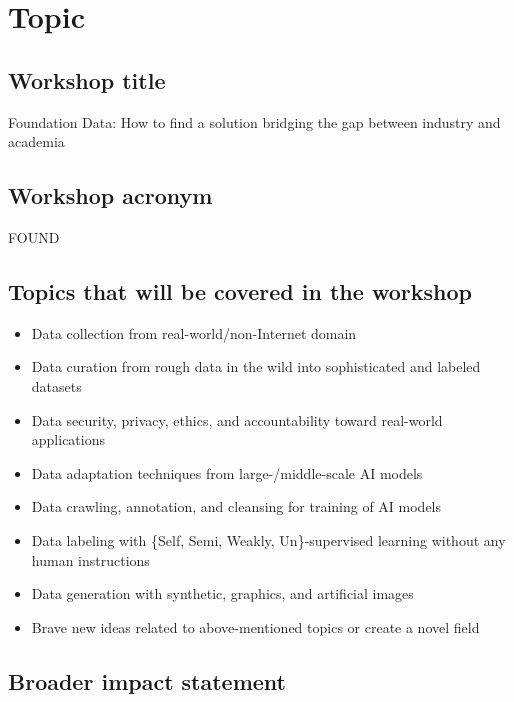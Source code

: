 \documentclass{article}
\begin{document}
\section{Topic}

\subsection{Workshop title}
Foundation Data: How to find a solution bridging the gap between industry and academia

\subsection{Workshop acronym}
FOUND

\subsection{Topics that will be covered in the workshop}
\begin{itemize}
    \item Data collection from real-world/non-Internet domain
    \item Data curation from rough data in the wild into sophisticated and labeled datasets
    \item Data security, privacy, ethics, and accountability toward real-world applications
    \item Data adaptation techniques from large-/middle-scale AI models
    \item Data crawling, annotation, and cleansing for training of AI models
    \item Data labeling with \{Self, Semi, Weakly, Un\}-supervised learning without any human instructions
    \item Data generation with synthetic, graphics, and artificial images
    \item Brave new ideas related to above-mentioned topics or create a novel field
\end{itemize}

\subsection{Broader impact statement}
\end{document}
